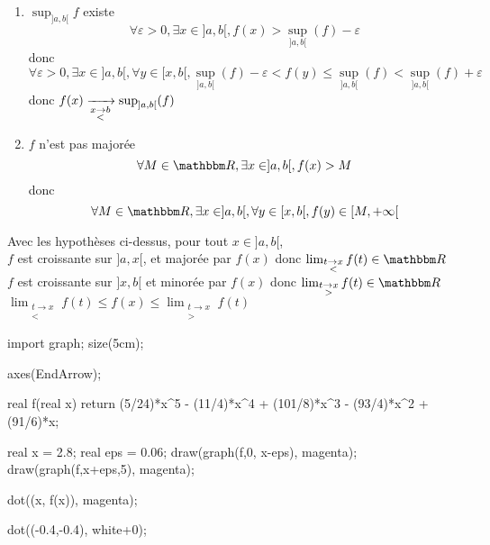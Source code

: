 \begin{prv}
	\begin{enumerate}
		\item $\sup_{]a,b[}f$ existe\\
			\[
				\forall \varepsilon>0, \exists x \in ]a,b[, f(x) > \sup_{]a,b[}(f) - \varepsilon
			\] donc \[
				\forall \varepsilon >0, \exists x \in ]a,b[, \forall y \in [x,b[, \sup_{]a,b[}(f) - \varepsilon < f(y) \le \sup_{]a,b[}(f) < \sup_{]a,b[}(f) + \varepsilon
			\] donc $f(x) \xrightarrow[\substack{
				x \to b\\
				<
			}]{} \sup_{]a,b[}(f)$ 
		\item $f$ n'est pas majorée \[
			\forall M \in \R, \exists x \in ]a,b[, f(x) > M
		\] donc \[
			\forall M \in \R, \exists x \in ]a,b[, \forall  y \in [x,b[, f(y) \in [M, +\infty[
		\]
	\end{enumerate}
\end{prv}

\begin{rmk}
	Avec les hypothèses ci-dessus, pour tout $x \in ]a,b[$,\\
	$f$ est croissante sur $]a,x[$, et majorée par  $f(x)$ donc $\lim_{\substack{
		t \to x\\
		<
	}}f(t) \in \R$ \\
	$f$ est croissante sur $]x,b[$ et minorée par $f(x)$ donc $\lim_{\substack{
		t \to x\\
		>
	}} f(t) \in \R$\\
	$
	\lim_{\substack{
		t \to x\\
		<
	}} f(t)\le 
	f(x)
	\le \lim_{\substack{
		t \to x\\
		>
	}} f(t)$

	\begin{center}
		\begin{asy}
			import graph;
			size(5cm);

			axes(EndArrow);

			real f(real x) {
				return (5/24)*x^5 - (11/4)*x^4 + (101/8)*x^3 - (93/4)*x^2 + (91/6)*x;
			}

			real x = 2.8;
			real eps = 0.06;
			draw(graph(f,0, x-eps), magenta);
			draw(graph(f,x+eps,5), magenta);
			
			dot((x, f(x)), magenta);

			dot((-0.4,-0.4), white+0);
		\end{asy}
	\end{center}
\end{rmk}

